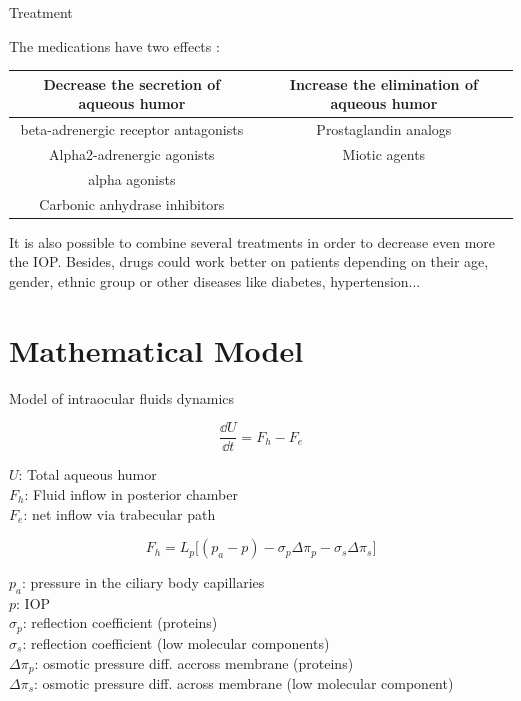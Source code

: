 \begin{frame}{Treatment}

The medications have two effects :
\newline
\\
\begin{tabular}{|c|c|}
\hline
Decrease the secretion of aqueous humor & Increase the elimination of aqueous humor\\
\hline
beta-adrenergic receptor antagonists & Prostaglandin analogs \\
Alpha2-adrenergic agonists & Miotic agents \\
alpha agonists &  \\
Carbonic anhydrase inhibitors &  \\
\hline
\end{tabular}
\newline
\newline
It is also possible to combine several treatments in order to decrease even more the IOP.
Besides, drugs could work better on patients depending on their age, gender, ethnic group or other diseases like diabetes, hypertension...

\end{frame}

\section{Mathematical Model}

\begin{frame}{Model of intraocular fluids dynamics}
\begin{block}{}
\[
\frac{\dd U}{\dd t}=F_{h}-F_{e}
\]
\end{block}
$U$: Total aqueous humor\\
$F_h$: Fluid inflow in posterior chamber\\
$F_e$: net inflow via trabecular path



\[
F_{h}= L_p \big[ (p_a-p)-\sigma_{p} \Delta\pi_{p}-\sigma_{s} \Delta\pi_{s}\big]
\]

$p_a$: pressure in the ciliary body capillaries\\
$p$: IOP \\
$\sigma_p$: reflection coefficient (proteins)\\
$\sigma_s$: reflection coefficient (low molecular components)\\

$\Delta \pi_p $: osmotic pressure diff. accross membrane (proteins)\\
$\Delta \pi_s $: osmotic pressure diff. across membrane (low molecular component)

\end{frame}

